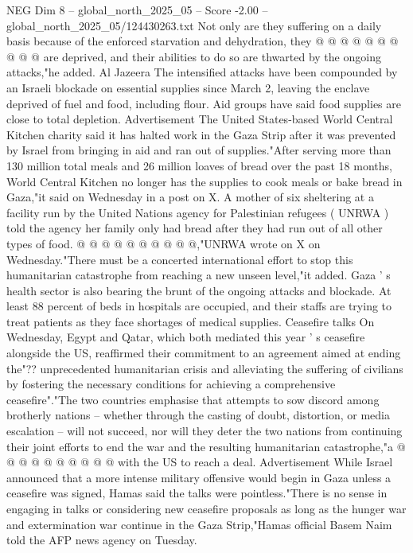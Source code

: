 \begin{textsample}{NEG Dim 8 – global\_north\_2025\_05 – Score -2.00 – global\_north\_2025\_05/124430263.txt}
Not only are they suffering on a daily basis because of the enforced starvation and dehydration, they @ @ @ @ @ @ @ @ @ @ are deprived, and their abilities to do so are thwarted by the ongoing attacks,"he added.
Al Jazeera The intensified attacks have been compounded by an Israeli blockade on essential supplies since March 2, leaving the enclave deprived of fuel and food, including flour.
Aid groups have said food supplies are close to total depletion.
Advertisement The United States-based World Central Kitchen charity said it has halted work in the Gaza Strip after it was prevented by Israel from bringing in aid and ran out of supplies."After serving more than 130 million total meals and 26 million loaves of bread over the past 18 months, World Central Kitchen no longer has the supplies to cook meals or bake bread in Gaza,"it said on Wednesday in a post on X.
A mother of six sheltering at a facility run by the United Nations agency for Palestinian refugees ( UNRWA ) told the agency her family only had bread after they had run out of all other types of food. @ @ @ @ @ @ @ @ @ @,"UNRWA wrote on X on Wednesday."There must be a concerted international effort to stop this humanitarian catastrophe from reaching a new unseen level,"it added.
Gaza ' s health sector is also bearing the brunt of the ongoing attacks and blockade.
At least 88 percent of beds in hospitals are occupied, and their staffs are trying to treat patients as they face shortages of medical supplies.
Ceasefire talks On Wednesday, Egypt and Qatar, which both mediated this year ' s ceasefire alongside the US, reaffirmed their commitment to an agreement aimed at ending the"?? unprecedented humanitarian crisis and alleviating the suffering of civilians by fostering the necessary conditions for achieving a comprehensive ceasefire"."The two countries emphasise that attempts to sow discord among brotherly nations -- whether through the casting of doubt, distortion, or media escalation -- will not succeed, nor will they deter the two nations from continuing their joint efforts to end the war and the resulting humanitarian catastrophe,"a @ @ @ @ @ @ @ @ @ @ with the US to reach a deal.
Advertisement While Israel announced that a more intense military offensive would begin in Gaza unless a ceasefire was signed, Hamas said the talks were pointless."There is no sense in engaging in talks or considering new ceasefire proposals as long as the hunger war and extermination war continue in the Gaza Strip,"Hamas official Basem Naim told the AFP news agency on Tuesday.

\end{textsample}
